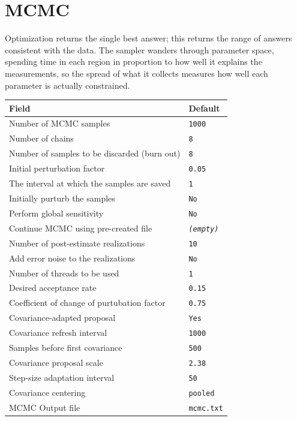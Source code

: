 \documentclass[11pt]{article}
\begin{document}
\section{MCMC}
Optimization returns the single best answer; this returns the range of answers consistent with the data. The sampler wanders through parameter space, spending time in each region in proportion to how well it explains the measurements, so the spread of what it collects measures how well each parameter is actually constrained.
\begin{longtable}{@{}p{}p{}@{}}
\toprule \textrm{Field} & \textrm{Default} \\ \midrule \endhead
Number of MCMC samples & \texttt{\small 1000} \\
Number of chains & \texttt{\small 8} \\
Number of samples to be discarded (burn out) & \texttt{\small 8} \\
Initial perturbation factor & \texttt{\small 0.\allowbreak{}05} \\
The interval at which the samples are saved & \texttt{\small 1} \\
Initially purturb the samples & \texttt{\small No} \\
Perform global sensitivity & \texttt{\small No} \\
Continue MCMC using pre-created file & \texttt{\small \textit{(empty)}} \\
Number of post-estimate realizations & \texttt{\small 10} \\
Add error noise to the realizations & \texttt{\small No} \\
Number of threads to be used & \texttt{\small 1} \\
Desired acceptance rate & \texttt{\small 0.\allowbreak{}15} \\
Coefficient of change of purtubation factor & \texttt{\small 0.\allowbreak{}75} \\
Covariance-adapted proposal & \texttt{\small Yes} \\
Covariance refresh interval & \texttt{\small 1000} \\
Samples before first covariance & \texttt{\small 500} \\
Covariance proposal scale & \texttt{\small 2.\allowbreak{}38} \\
Step-size adaptation interval & \texttt{\small 50} \\
Covariance centering & \texttt{\small pooled} \\
MCMC Output file & \texttt{\small mcmc.\allowbreak{}txt} \\
\bottomrule\end{longtable}
\end{document}
